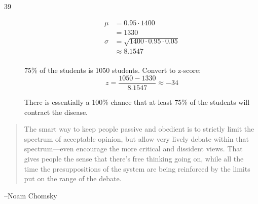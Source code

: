 \documentclass[letterpaper, landscape]{exam}
\begin{document}
\begin{description}
\begin{enumerate}[(a)]
        \end{enumerate}

      \item[39]
        \begin{enumerate}[(a)]
          \begin{align*}
            \mu    & = 0.95 \cdot 1400 \\
                   & = 1330 \\
            \sigma & = \sqrt{1400 \cdot 0.95 \cdot 0.05} \\
                   & \approx 8.1547 \\
          \end{align*}

          75\% of the students is 1050 students. Convert to z-score:
          \[
            z = \frac{1050 - 1330}{8.1547} \approx -34
          \]

          There is essentially a 100\% chance that at least 75\% of the
          students will contract the disease.

        \end{enumerate}
  \end{description}

  \else
    \vspace{7 cm}
    \begin{quote}
      \begin{em}
        The smart way to keep people passive and obedient is to strictly limit
        the spectrum of acceptable opinion, but allow very lively debate within
        that spectrum---even encourage the more critical and dissident views.
        That gives people the sense that there's free thinking going on, while
        all the time the presuppositions of the system are being reinforced by
        the limits put on the range of the debate.
      \end{em}
    \end{quote}
    \hspace{1 cm}--Noam Chomsky
  \fi
\end{document}
